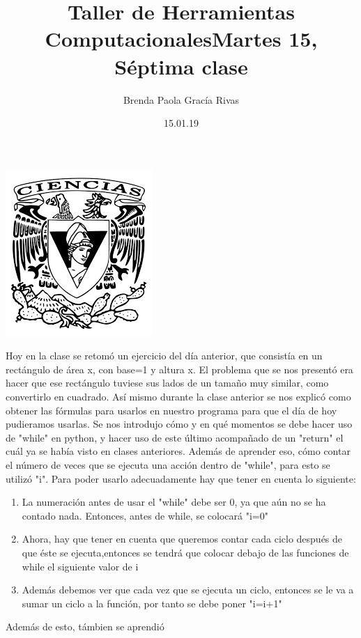 \documentclass[letterpaper, 12pt, oneside]{article}
\title{\huge \color{green}Taller de Herramientas Computacionales}
\author{Brenda Paola Gracía Rivas}
\date{15.01.19}
\begin{document}
	\maketitle
	\begin{center}
		\includegraphics[scale=1.0]{1.png}
	\end{center}
	\newpage
	\title{Martes 15, Séptima clase\\}
	Hoy en la clase se retomó un ejercicio del día anterior, que consistía en un rectángulo de área x, con base=1 y altura x. El problema que se nos presentó era hacer que ese rectángulo tuviese sus lados de un tamaño muy similar, como convertirlo en cuadrado.
	Así mismo durante la clase anterior se nos explicó como obtener las fórmulas para usarlos en nuestro programa para que el día de hoy pudieramos usarlas. Se nos introdujo cómo y en qué momentos se debe hacer uso de "while" en python, y hacer uso de este último acompañado de un "return" el cuál ya se había visto en clases anteriores.
	Además de aprender eso, cómo contar el número de veces que se ejecuta una acción dentro de "while", para esto se utilizó "i". Para poder usarlo adecuadamente hay que tener en cuenta lo siguiente:
	\begin{enumerate}
		\item 
		La numeración antes de usar el "while" debe ser 0, ya que aún no se ha contado nada. Entonces, antes de while, se colocará "i=0"
		\item 
		Ahora, hay que tener en cuenta que queremos contar cada ciclo después de que éste se ejecuta,entonces se tendrá que colocar debajo de las funciones de while el siguiente valor de i
		\item 
		Además debemos ver que cada vez que se ejecuta un ciclo, entonces se le va a sumar un ciclo a la función, por tanto se debe poner "i=i+1"
	\end{enumerate}
	 Además de esto, támbien se aprendió 
\end{document}
